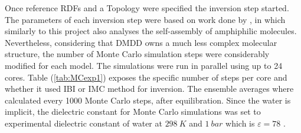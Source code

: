 \documentclass[10pt,a4paper,twoside]{article}
\begin{document}
 Once reference RDFs and a Topology were specified the inversion step started. The parameters of each inversion step were based on work done by , in which similarly to this project also analyses the self-assembly of amphiphilic molecules. Nevertheless, considering that DMDD owns a much less complex molecular structure, the number of Monte Carlo simulation steps were considerably modified for each model. The simulations were run in parallel using up to 24 cores. Table (\ref{tab:MCexp1}) exposes the specific number of steps per core and whether it used IBI or IMC method for inversion. The ensemble  averages where calculated every 1000 Monte Carlo steps, after equilibration. Since the water is implicit, the dielectric constant for Monte Carlo simulations was set to experimental dielectric constant of water at $298\ K$ and $1\ bar$ which is $\varepsilon = 78$ \cite{dconst}. 
 
\end{document}
